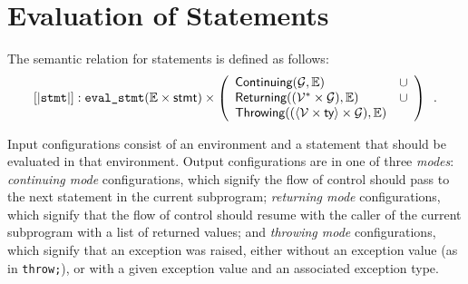 \documentclass{book}
\newcommand\semantic[1]{\llbracket #1 \rrbracket}
\newcommand\XGraphs[0]{\mathcal{G}}
\newcommand\vals[0]{\mathcal{V}}
\newcommand\evalstmt[1]{\texttt{eval\_stmt}(#1)}
\newcommand\Throwing[0]{\textsf{Throwing}}
\newcommand\Continuing[0]{\textsf{Continuing}}
\newcommand\Returning[0]{\textsf{Returning}}
\begin{document}

\chapter{Evaluation of Statements \label{chap:eval_stmt}}

The semantic relation for statements is defined as follows:
\[
  \semantic{\texttt{stmt}} : \evalstmt{\envs \times \stmt} \times \left(
    \begin{array}{ll}
    \Continuing(\XGraphs, \envs) &\cup\\
    \Returning((\vals^* \times \XGraphs), \envs) &\cup\\
    \Throwing((\langle\vals \times \ty\rangle \times \XGraphs), \envs)&
    \end{array}
  \right) \enspace.
\]

Input configurations consist of an environment and a statement that should be evaluated in that environment.
Output configurations are in one of three \emph{modes}: \emph{continuing mode} configurations, which signify
the flow of control should pass to the next statement in the current subprogram;
\emph{returning mode} configurations, which signify that the flow of control should resume with the caller
of the current subprogram with a list of returned values;
and \emph{throwing mode} configurations, which signify that an exception was raised, either without an exception value (as in \texttt{throw;}),
or with a given exception value and an associated exception type.
\end{document}
